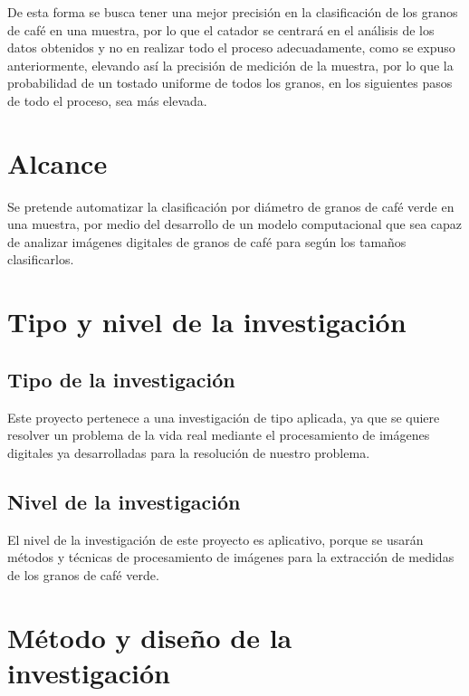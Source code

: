 De esta forma se busca tener una mejor precisión en la clasificación de los granos de café en una muestra, por lo que el catador se centrará en el análisis de los datos obtenidos y no en realizar todo el proceso adecuadamente, como se expuso anteriormente, elevando así la precisión de medición de la muestra, por lo que la probabilidad de un tostado uniforme de todos los granos, en los siguientes pasos de todo el proceso, sea más elevada.


\section{Alcance}
Se pretende automatizar la clasificación por diámetro de granos de café verde en una muestra, por medio del desarrollo de un modelo computacional que sea capaz de analizar imágenes digitales  de granos de café para según los tamaños clasificarlos.


\section{Tipo y nivel de la investigación}

\subsection{Tipo de la investigación}
Este proyecto pertenece a una investigación de tipo aplicada, ya que se quiere resolver un problema de la vida real mediante el procesamiento de imágenes digitales ya desarrolladas para la resolución de nuestro problema.

\subsection{Nivel de la investigación}
El nivel de la investigación de este proyecto es aplicativo, porque se usarán métodos y técnicas de procesamiento de imágenes para la extracción de medidas de los granos de café verde.


\section{Método y diseño de la investigación}

